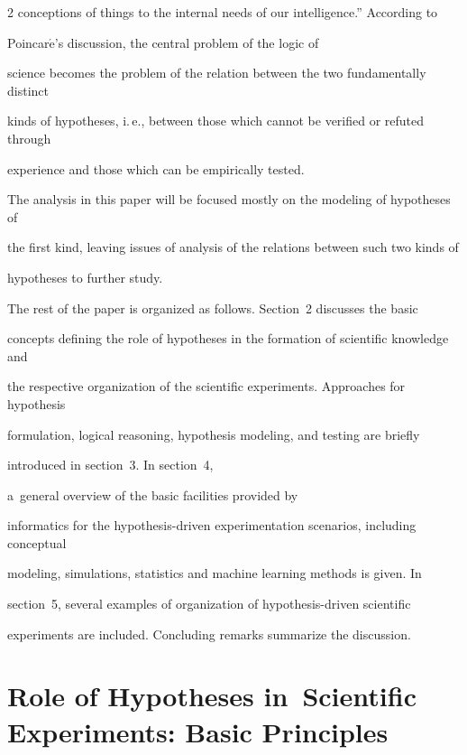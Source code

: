 \begin{multicols}{2}
conceptions of things to the internal needs of our intelligence.'' According to


Poincar$\acute{\mbox{e}}$'s discussion, the central problem of the logic of


science becomes the problem of the relation between the two fundamentally distinct


kinds of hypotheses, i.\,e., between those which cannot be verified or refuted through


experience and those which can be empirically tested.





  The analysis in this paper will be focused mostly on the modeling of hypotheses of


the first kind, leaving issues of analysis of the relations between such two kinds of


hypotheses to further study.





  The rest of the paper is organized as follows.  Section~2 discusses the basic


concepts defining the role of hypotheses in the formation of scientific knowledge and


the respective organization of the scientific experiments. Approaches for hypothesis


formulation, logical reasoning, hypothesis modeling, and testing are briefly


introduced in section~3. In section~4,


 a~general overview of the basic facilities provided by


informatics for the hypothesis-driven experimentation scenarios, including conceptual


modeling, simulations, statistics and machine learning methods is given. In


section~5, several examples of organization of hypothesis-driven scientific


experiments are included. Concluding remarks summarize the discussion.





\section{Role of Hypotheses in~Scientific Experiments: Basic Principles}






\end{multicols}
